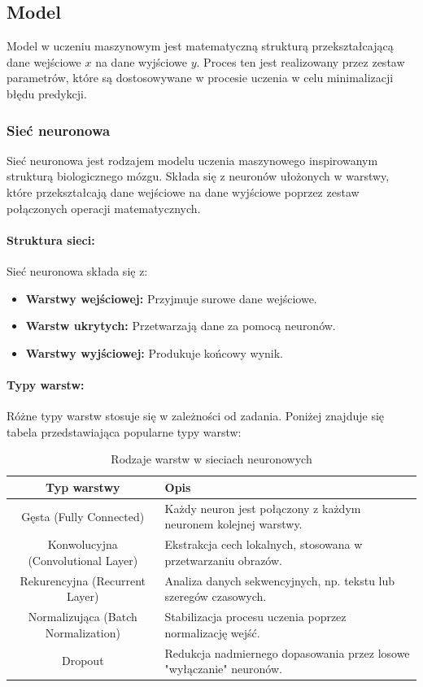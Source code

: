\subsection{Model}

Model w uczeniu maszynowym jest matematyczną strukturą przekształcającą dane wejściowe \(x\) na dane wyjściowe \(y\). Proces ten jest realizowany przez zestaw parametrów, które są dostosowywane w procesie uczenia w celu minimalizacji błędu predykcji.

\subsubsection{Sieć neuronowa}

Sieć neuronowa jest rodzajem modelu uczenia maszynowego inspirowanym strukturą biologicznego mózgu. Składa się z neuronów ułożonych w warstwy, które przekształcają dane wejściowe na dane wyjściowe poprzez zestaw połączonych operacji matematycznych.

\paragraph{Struktura sieci:}
Sieć neuronowa składa się z:
\begin{itemize}
	\item \textbf{Warstwy wejściowej:} Przyjmuje surowe dane wejściowe.
	\item \textbf{Warstw ukrytych:} Przetwarzają dane za pomocą neuronów.
	\item \textbf{Warstwy wyjściowej:} Produkuje końcowy wynik.
\end{itemize}

\paragraph{Typy warstw:}
Różne typy warstw stosuje się w zależności od zadania. Poniżej znajduje się tabela przedstawiająca popularne typy warstw:

\begin{table}[h!]
	\centering
	\caption{Rodzaje warstw w sieciach neuronowych}
	\label{tab:layer_types}
	\begin{tabular}{|c|l|}
		\hline
		\textbf{Typ warstwy}                & \textbf{Opis}                                                        \\ \hline
		Gęsta (Fully Connected)             & Każdy neuron jest połączony z każdym neuronem kolejnej warstwy.      \\ \hline
		Konwolucyjna (Convolutional Layer)  & Ekstrakcja cech lokalnych, stosowana w przetwarzaniu obrazów.        \\ \hline
		Rekurencyjna (Recurrent Layer)      & Analiza danych sekwencyjnych, np. tekstu lub szeregów czasowych.     \\ \hline
		Normalizująca (Batch Normalization) & Stabilizacja procesu uczenia poprzez normalizację wejść.             \\ \hline
		Dropout                             & Redukcja nadmiernego dopasowania przez losowe "wyłączanie" neuronów. \\ \hline
	\end{tabular}
\end{table}

